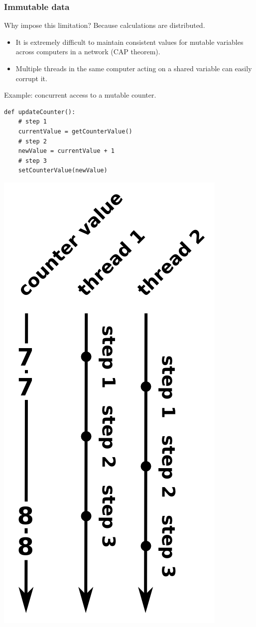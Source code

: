 \documentclass{beamer}
\begin{document}
\begin{frame}[fragile]
\frametitle{Immutable data}

Why impose this limitation? Because calculations are distributed.

\begin{itemize}
\item It is extremely difficult to maintain consistent values for mutable variables across computers in a network (CAP theorem).
\item Multiple threads in the same computer acting on a shared variable can easily corrupt it.
\end{itemize}

\vspace{0.75 cm}
Example: concurrent access to a mutable counter.

\begin{lstlisting}
def updateCounter():
    # step 1
    currentValue = getCounterValue()
    # step 2
    newValue = currentValue + 1
    # step 3
    setCounterValue(newValue)
\end{lstlisting}

\vspace{-4.5 cm}
\hfill \includegraphics[width=0.23\linewidth]{time_mutable.png}
\end{frame}
\end{document}
